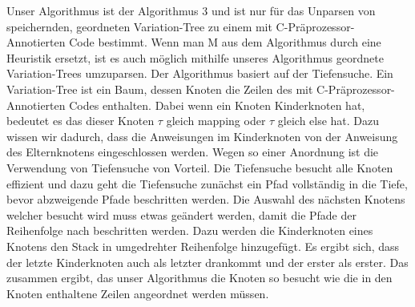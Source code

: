 Unser Algorithmus ist der Algorithmus 3 und ist nur für das Unparsen von speichernden, geordneten Variation-Tree zu einem mit C-Präprozessor-Annotierten Code bestimmt. Wenn man M aus dem Algorithmus durch eine Heuristik ersetzt, ist es auch möglich mithilfe unseres Algorithmus geordnete Variation-Trees umzuparsen. Der Algorithmus basiert auf der Tiefensuche. Ein Variation-Tree ist ein Baum, dessen Knoten die Zeilen des  mit C-Präprozessor-Annotierten Codes enthalten. Dabei wenn ein Knoten Kinderknoten hat, bedeutet es das dieser Knoten $\tau$ gleich mapping oder $\tau$ gleich else hat. Dazu wissen wir dadurch, dass die Anweisungen im Kinderknoten von der Anweisung des Elternknotens eingeschlossen werden. Wegen so einer Anordnung ist die Verwendung von Tiefensuche von Vorteil. Die Tiefensuche besucht alle Knoten effizient und dazu geht die Tiefensuche zunächst ein Pfad vollständig in die Tiefe, bevor abzweigende Pfade beschritten werden. Die Auswahl des nächsten Knotens welcher besucht wird muss etwas geändert werden, damit die Pfade der Reihenfolge nach beschritten werden. Dazu werden die Kinderknoten eines Knotens den Stack in umgedrehter Reihenfolge hinzugefügt. Es ergibt sich, dass der letzte Kinderknoten auch als letzter drankommt und der erster als erster. Das zusammen ergibt, das unser Algorithmus die Knoten so besucht wie die in den Knoten enthaltene Zeilen angeordnet werden müssen.\\

